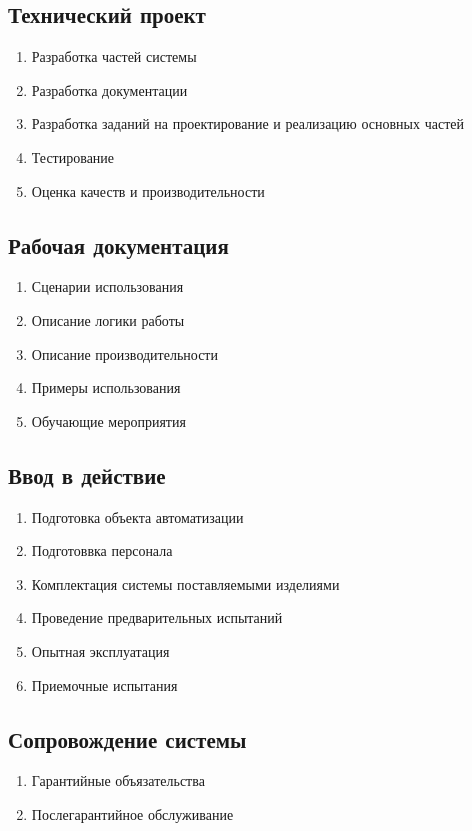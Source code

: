 \documentclass[12pt; a4paper]{article}
\begin{document}
\subsection{Технический проект}
\begin{enumerate}
\item Разработка частей системы
\item Разработка документации
\item  Разработка заданий на проектирование и реализацию основных частей
\item Тестирование
\item Оценка качеств и производительности
\end{enumerate}

\subsection{Рабочая документация}
\begin{enumerate}
\item Сценарии использования
\item Описание логики работы
\item Описание производительности
\item Примеры использования
\item Обучающие мероприятия
\end{enumerate}

\subsection{Ввод в действие}
\begin{enumerate}
\item Подготовка объекта автоматизации
\item Подготоввка персонала
\item Комплектация системы поставляемыми изделиями
\item Проведение предварительных испытаний
\item Опытная эксплуатация
\item Приемочные испытания
\end{enumerate}

\subsection{Сопровождение системы}
\begin{enumerate}
\item Гарантийные объязательства
\item Послегарантийное обслуживание
\end{enumerate}
\end{document}
